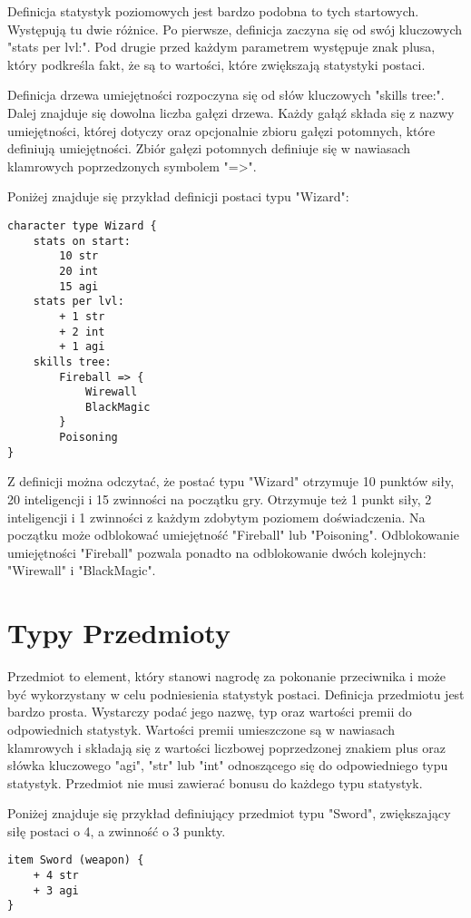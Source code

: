 \documentclass	{xmgr}
\begin{document}
Definicja statystyk poziomowych jest bardzo podobna to tych startowych. Występują tu dwie różnice. Po pierwsze, definicja zaczyna się od swój kluczowych "stats per lvl:". Pod drugie przed każdym parametrem występuje znak plusa, który podkreśla fakt, że są to wartości, które zwiększają statystyki postaci. 

Definicja drzewa umiejętności rozpoczyna się od słów kluczowych "skills tree:". Dalej znajduje się dowolna liczba gałęzi drzewa.
Każdy gałąź składa się z nazwy umiejętności, której dotyczy oraz opcjonalnie zbioru gałęzi potomnych, które definiują umiejętności.
Zbiór gałęzi potomnych definiuje się w nawiasach klamrowych poprzedzonych symbolem "=>". 

Poniżej znajduje się przykład definicji postaci typu "Wizard":
\begin{lstlisting}
character type Wizard {
	stats on start:
		10 str
		20 int
		15 agi
	stats per lvl:
		+ 1 str
		+ 2 int
		+ 1 agi
	skills tree:
		Fireball => {
			Wirewall
			BlackMagic
		}
		Poisoning
}
\end{lstlisting}
Z definicji można odczytać, że postać typu "Wizard" otrzymuje 10 punktów siły, 20 inteligencji i 15 zwinności na początku gry.
Otrzymuje też 1 punkt siły, 2 inteligencji i 1 zwinności z każdym zdobytym poziomem doświadczenia.
Na początku może odblokować umiejętność "Fireball" lub "Poisoning". Odblokowanie umiejętności "Fireball" pozwala ponadto na odblokowanie dwóch kolejnych: "Wirewall" i "BlackMagic". 

\section{Typy Przedmioty}
Przedmiot to element, który stanowi nagrodę za pokonanie przeciwnika i może być wykorzystany w celu podniesienia statystyk postaci. 
Definicja przedmiotu jest bardzo prosta. Wystarczy podać jego nazwę, typ oraz wartości premii do odpowiednich statystyk.
Wartości premii umieszczone są w nawiasach klamrowych i składają się z wartości liczbowej poprzedzonej znakiem plus oraz słówka kluczowego "agi", "str" lub "int" odnoszącego się do odpowiedniego typu statystyk. Przedmiot nie musi zawierać bonusu do każdego typu statystyk.

Poniżej znajduje się przykład definiujący przedmiot typu "Sword", zwiększający siłę postaci o 4, a zwinność o 3 punkty.
\begin{lstlisting}
item Sword (weapon) {
	+ 4 str
	+ 3 agi
}
\end{lstlisting}
\end{document}
